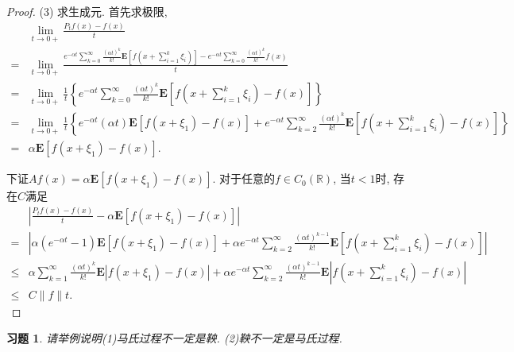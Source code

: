 \documentclass[UTF8,ondside]{ctexart}
\newtheorem{exercise}{习题}[section]
\newcommand{\kx}{\mathbb}
\newcommand{\mbf}{\mathbf}
\numberwithin{equation}{section}
\begin{document}
\begin{proof}
		(3) 求生成元. 首先求极限,
		\[
		\begin{aligned}
			&\lim_{t\rightarrow 0+}\frac{P_t f(x)-f(x)}{t}\\
			=& \lim_{t\rightarrow 0+} \frac{e^{-\alpha t}\sum_{k=0}^\infty \frac{(\alpha t)^k}{k!}\mbf E\left[f(x+\sum_{i=1}^k\xi_i)\right]-e^{-\alpha t}\sum_{k=0}^\infty\frac{(\alpha t)^k}{k!}f(x)}{t}\\
			=& \lim_{t\rightarrow 0+}\frac{1}{t}\left\{
				e^{-\alpha t} \sum_{k=0}^\infty\frac{(\alpha t)^k}{k!}\mbf E\left[f(x+\sum_{i=1}^k\xi_i)-f(x)\right]
			\right\}\\
			=& \lim_{t\rightarrow 0+}\frac{1}{t} \left\{
				e^{-\alpha t}(\alpha t)\mbf E[f(x+\xi_1)-f(x)]+e^{-\alpha t} \sum_{k=2}^\infty\frac{(\alpha t)^k}{k!}\mbf E\left[f(x+\sum_{i=1}^k\xi_i)-f(x)\right]
			\right\}\\
			= & \alpha \mbf E[f(x+\xi_1)-f(x)].
		\end{aligned}
		\]

		下证$A f(x)=\alpha\mbf E[f(x+\xi_1)-f(x)]$. 对于任意的$f\in C_0(\kx R)$, 当$t<1$时, 存在$C$满足
		\[
			\begin{aligned}
				&\left|
				\frac{P_t f(x)-f(x)}{t}-\alpha\mbf E[f(x+\xi_1)-f(x)]
				\right|\\
				=& \left|
				\alpha (e^{-\alpha t}-1)\mbf E[f(x+\xi_1)-f(x)]+\alpha e^{-\alpha t}\sum_{k=2}^\infty \frac{(\alpha t)^{k-1}}{k!}\mbf E\left[f(x+\sum_{i=1}^k\xi_i)-f(x)\right]
				\right|\\
				\leq & \alpha \sum_{k=1}^\infty \frac{(\alpha t)^k}{k!}\mbf E\left| f(x+\xi_1)-f(x)\right|+\alpha e^{-\alpha t}\sum_{k=2}^\infty \frac{(\alpha t)^{k-1}}{k!} \mbf E \left| f(x+\sum_{i=1}^k\xi_i)-f(x)\right|\\
				\leq & C\|f\|t.
			\end{aligned}
		\]
	\end{proof}
	\begin{exercise}
		请举例说明(1)马氏过程不一定是鞅. (2)鞅不一定是马氏过程.
	\end{exercise}
\end{document}
